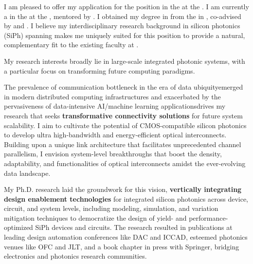 I am pleased to offer my application for the \appPosition{} position \appJobID{} in the \appDept{} at the \appSchool{}. I am currently a \myTitle{} in the \myDept{} at the \mySchoolShort{}, mentored by \mySuper{}. I obtained my \myDegree{} degree in \myMajor{} from the \myPhDSchool{} in \myPhDYear{}, co-advised by \myAdvisor{} and \myCoAdvisor{}. I believe my interdisciplinary research background in silicon photonics (SiPh) spanning \appArea{} makes me uniquely suited for this position to provide a natural, complementary fit to the existing faculty at \appSchoolDeptShort{}.

My research interests broadly lie in large-scale integrated photonic systems, with a particular focus on transforming future computing paradigms.

The prevalence of communication bottleneck in the era of data ubiquity\textemdash emerged in modern distributed computing infrastructures and exacerbated by the pervasiveness of data-intensive AI/machine learning applications\textemdash drives my research that seeks \textbf{transformative connectivity solutions} for future system scalability. I aim to cultivate the potential of CMOS-compatible silicon photonics to develop ultra high-bandwidth and energy-efficient optical interconnects. Building upon a unique link architecture that facilitates unprecedented channel parallelism, I envision system-level breakthroughs that boost the density, adaptability, and functionalities of optical interconnects amidst the ever-evolving data landscape.

My Ph.D. research laid the groundwork for this vision, \textbf{vertically integrating design enablement technologies} for integrated silicon photonics across device, circuit, and system levels, including modeling, simulation, and variation mitigation techniques to democratize the design of yield- and performance-optimized SiPh devices and circuits. The research resulted in publications at leading design automation conferences like DAC and ICCAD, esteemed photonics venues like OFC and JLT, and a book chapter in press with Springer, bridging electronics and photonics research communities.

